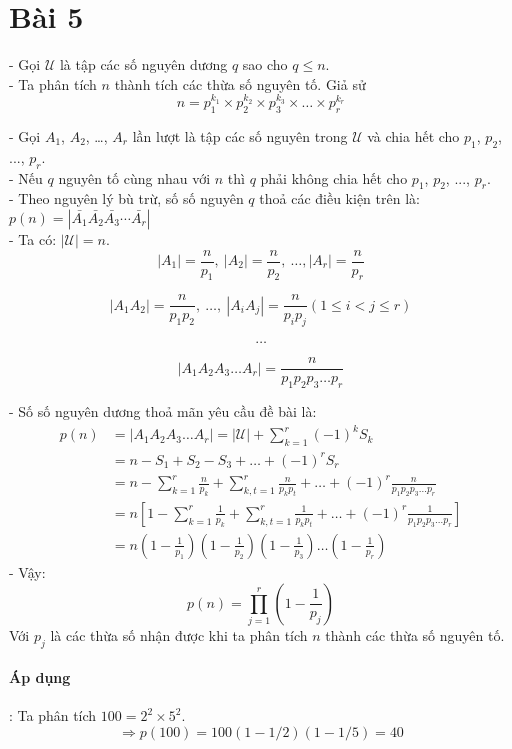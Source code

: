 \documentclass[main.tex]{subfiles}
\begin{document}
\section{Bài 5}
\newcommand{\U}{$\mathcal U$ }
\newcommand{\A}[1]{$A_{#1}$}
\newcommand{\abs}[1]{\left|#1\right|}
\newcommand{\ssum}[3]{\sum_{#1}^{#2}{#3}}

- Gọi \U là tập các số nguyên dương $q$ sao cho $q \le n$.\\
- Ta phân tích $n$ thành tích các thừa số nguyên tố. Giả sử
$$
n = p_1^{k_1} \times p_2^{k_2} \times p_3^{k_3} \times \dots \times p_r^{k_r} 
$$

- Gọi \A 1, \A 2, \dots, \A r lần lượt là tập các số nguyên trong \U  và chia hết cho $p_1$, $p_2$, ..., $p_r$.\\
- Nếu $q$ nguyên tố cùng nhau với $n$ thì $q$ phải không chia hết cho $p_1$, $p_2$, ..., $p_r$.\\
- Theo nguyên lý bù trừ, số số nguyên $q$ thoả các điều kiện trên là: $p(n) = \left|\bar{A_1}\bar{A_2}\bar{A_3}\cdots\bar{A_r}\right|$\\
- Ta có: $\abs{\mathcal U} = n$.\\
$$
\abs{A_1}=\frac{n}{p_1},\ \abs{A_2}=\frac{n}{p_2},\ \dots, \abs{A_r}=\frac{n}{p_r} 
$$

$$
\abs{A_1A_2}=\frac{n}{p_1p_2},\ \dots,\ \abs{A_iA_j}=\frac{n}{p_ip_j} (1 \le i < j \le r)
$$

$$
\dots
$$

$$
\abs{A_1A_2A_3 \dots A_r}=\frac{n}{p_1p_2p_3\dots p_r}
$$

- Số số nguyên dương thoả mãn yêu cầu đề bài là:
\begin{align*}
p(n) &= \abs{A_1A_2A_3 \dots A_r}=\abs{\mathcal U} + \sum^{r}_{k=1}(-1)^kS_k \\ 
&= n - S_1 + S_2 - S_3 + \dots + (-1)^rS_r \\
&= n - \ssum{k=1}{r}{\frac{n}{p_k}} + \ssum{k,t=1}{r}{\frac{n}{p_kp_t}} + \dots + (-1)^r\frac{n}{p_1p_2p_3\dots p_r} \\
&= n \left[ 1 - \ssum{k=1}{r}{\frac{1}{p_k}} + \ssum{k,t=1}{r}{\frac{1}{p_kp_t}} + \dots + (-1)^r\frac{1}{p_1p_2p_3\dots p_r} \right]\\
&= n\left(1-\frac{1}{p_1}\right)\left(1-\frac{1}{p_2}\right)\left(1-\frac{1}{p_3}\right)\dots\left(1-\frac{1}{p_r}\right)
\end{align*}
- Vậy: 
$$
p(n) = \prod_{j=1}^{r}\left(1-\frac{1}{p_j}\right)
$$
Với $p_j$ là các thừa số nhận được khi ta phân tích $n$ thành các thừa số nguyên tố.

\paragraph*{Áp dụng}:
Ta phân tích $100=2^2\times 5^2$.
$$
\Rightarrow p(100)=100(1-1/2)(1-1/5)=40
$$
\end{document}
